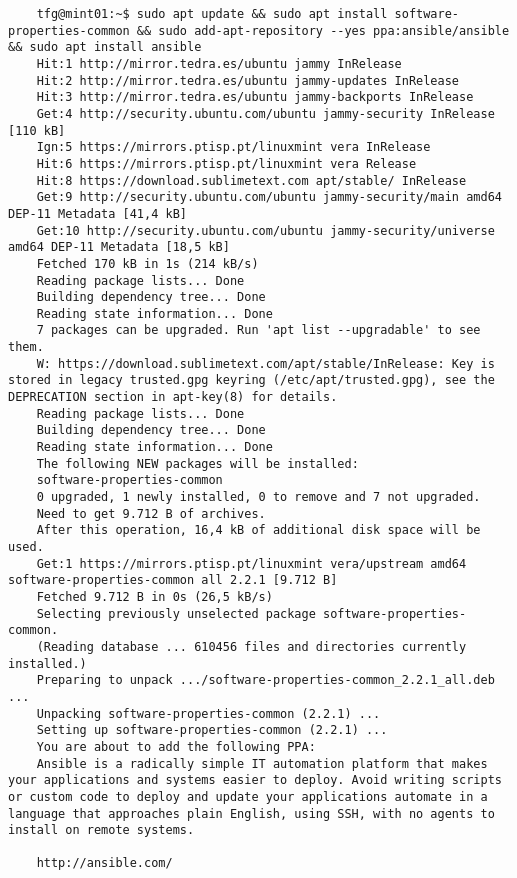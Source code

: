 \documentclass[../main.tex]{subfiles}
\begin{document}
\begin{lstlisting}
	tfg@mint01:~$ sudo apt update && sudo apt install software-properties-common && sudo add-apt-repository --yes ppa:ansible/ansible && sudo apt install ansible
	Hit:1 http://mirror.tedra.es/ubuntu jammy InRelease
	Hit:2 http://mirror.tedra.es/ubuntu jammy-updates InRelease                    
	Hit:3 http://mirror.tedra.es/ubuntu jammy-backports InRelease                  
	Get:4 http://security.ubuntu.com/ubuntu jammy-security InRelease [110 kB]      
	Ign:5 https://mirrors.ptisp.pt/linuxmint vera InRelease                        
	Hit:6 https://mirrors.ptisp.pt/linuxmint vera Release                          
	Hit:8 https://download.sublimetext.com apt/stable/ InRelease                   
	Get:9 http://security.ubuntu.com/ubuntu jammy-security/main amd64 DEP-11 Metadata [41,4 kB]
	Get:10 http://security.ubuntu.com/ubuntu jammy-security/universe amd64 DEP-11 Metadata [18,5 kB]
	Fetched 170 kB in 1s (214 kB/s)              
	Reading package lists... Done
	Building dependency tree... Done
	Reading state information... Done
	7 packages can be upgraded. Run 'apt list --upgradable' to see them.
	W: https://download.sublimetext.com/apt/stable/InRelease: Key is stored in legacy trusted.gpg keyring (/etc/apt/trusted.gpg), see the DEPRECATION section in apt-key(8) for details.
	Reading package lists... Done
	Building dependency tree... Done
	Reading state information... Done
	The following NEW packages will be installed:
	software-properties-common
	0 upgraded, 1 newly installed, 0 to remove and 7 not upgraded.
	Need to get 9.712 B of archives.
	After this operation, 16,4 kB of additional disk space will be used.
	Get:1 https://mirrors.ptisp.pt/linuxmint vera/upstream amd64 software-properties-common all 2.2.1 [9.712 B]
	Fetched 9.712 B in 0s (26,5 kB/s)                      
	Selecting previously unselected package software-properties-common.
	(Reading database ... 610456 files and directories currently installed.)
	Preparing to unpack .../software-properties-common_2.2.1_all.deb ...
	Unpacking software-properties-common (2.2.1) ...
	Setting up software-properties-common (2.2.1) ...
	You are about to add the following PPA:
	Ansible is a radically simple IT automation platform that makes your applications and systems easier to deploy. Avoid writing scripts or custom code to deploy and update your applications automate in a language that approaches plain English, using SSH, with no agents to install on remote systems.
	
	http://ansible.com/
	

\end{lstlisting}
\end{document}
